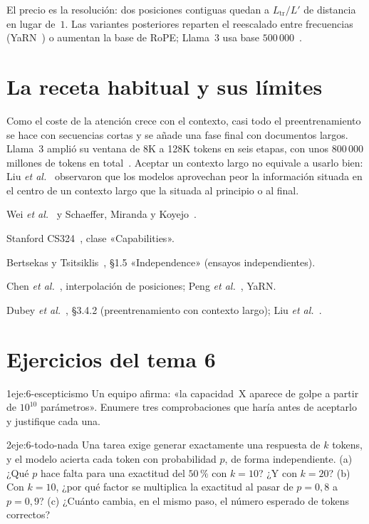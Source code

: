 El precio es la resolución: dos posiciones contiguas quedan a $L_{\mathrm{tr}}/L'$ de distancia en lugar de~$1$. Las variantes posteriores reparten el reescalado entre frecuencias (YaRN~\cite{yarn}) o aumentan la base de RoPE; Llama~3 usa base $500\,000$~\cite[§3.2]{llama3}.

\section{La receta habitual y sus límites}

Como el coste de la atención crece con el contexto, casi todo el preentrenamiento se hace con secuencias cortas y se añade una fase final con documentos largos. Llama~3 amplió su ventana de 8K a 128K tokens en seis etapas, con unos $800\,000$ millones de tokens en total~\cite[§3.4.2]{llama3}. Aceptar un contexto largo no equivale a usarlo bien: Liu \emph{et al.}~\cite{liu} observaron que los modelos aprovechan peor la información situada en el centro de un contexto largo que la situada al principio o al final.

\begin{lecturas}
\item Wei \emph{et al.}~\cite{wei} y Schaeffer, Miranda y Koyejo~\cite{schaeffer}.
\item Stanford CS324~\cite{cs324}, clase «Capabilities».
\item Bertsekas y Tsitsiklis~\cite{bt}, §1.5 «Independence» (ensayos independientes).
\item Chen \emph{et al.}~\cite{chenpi}, interpolación de posiciones; Peng \emph{et al.}~\cite{yarn}, YaRN.
\item Dubey \emph{et al.}~\cite{llama3}, §3.4.2 (preentrenamiento con contexto largo); Liu \emph{et al.}~\cite{liu}.
\end{lecturas}

\section*{Ejercicios del tema 6}

\begin{ejercicio}{1}{eje:6-escepticismo}
Un equipo afirma: «la capacidad~X aparece de golpe a partir de $10^{10}$ parámetros». Enumere tres comprobaciones que haría antes de aceptarlo y justifique cada una.
\end{ejercicio}

\begin{ejercicio}{2}{eje:6-todo-nada}
Una tarea exige generar exactamente una respuesta de $k$ tokens, y el modelo acierta cada token con probabilidad $p$, de forma independiente. (a) ¿Qué $p$ hace falta para una exactitud del $50\,\%$ con $k=10$? ¿Y con $k=20$? (b) Con $k=10$, ¿por qué factor se multiplica la exactitud al pasar de $p=0{,}8$ a $p=0{,}9$? (c) ¿Cuánto cambia, en el mismo paso, el número esperado de tokens correctos?
\end{ejercicio}


